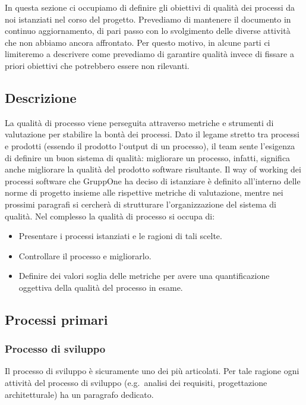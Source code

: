 \documentclass[../piano-di-qualifica.tex]{subfiles}
\begin{document}
In questa sezione ci occupiamo di definire gli obiettivi di qualità dei processi da noi istanziati nel corso del progetto.
Prevediamo di mantenere il documento in continuo aggiornamento, di pari passo con lo svolgimento delle diverse attività che non abbiamo ancora affrontato.
Per questo motivo, in alcune parti ci limiteremo a descrivere come prevediamo di garantire qualità invece di fissare a priori obiettivi che potrebbero essere non rilevanti.

\subsection{Descrizione}%
\label{sub:descrizione}

La qualità di processo viene perseguita attraverso metriche e strumenti di valutazione per stabilire la bontà dei processi.
Dato il legame stretto tra processi e prodotti (essendo il prodotto l`output di un processo), il team sente l'esigenza di definire un buon sistema di qualità: migliorare un processo, infatti, significa anche migliorare la qualità del prodotto software risultante.
Il way of working dei processi software che GruppOne ha deciso di istanziare è definito all'interno delle norme di progetto insieme alle rispettive metriche di valutazione, mentre nei prossimi paragrafi si cercherà di strutturare l'organizzazione del sistema di qualità.
Nel complesso la qualità di processo si occupa di:
\begin{itemize}
  \item Presentare i processi istanziati e le ragioni di tali scelte.
  \item Controllare il processo e migliorarlo.
  \item Definire dei valori soglia delle metriche per avere una quantificazione oggettiva della qualità del processo in esame.
\end{itemize}

\subsection{Processi primari}%
\label{sub:processi_primari}

\subsubsection{Processo di sviluppo}%
\label{subs:processo_di_sviluppo}
Il processo di sviluppo è sicuramente uno dei più articolati. Per tale ragione ogni attività del processo di sviluppo (e.g.\ analisi dei requisiti, progettazione architetturale) ha un paragrafo dedicato.
\end{document}
